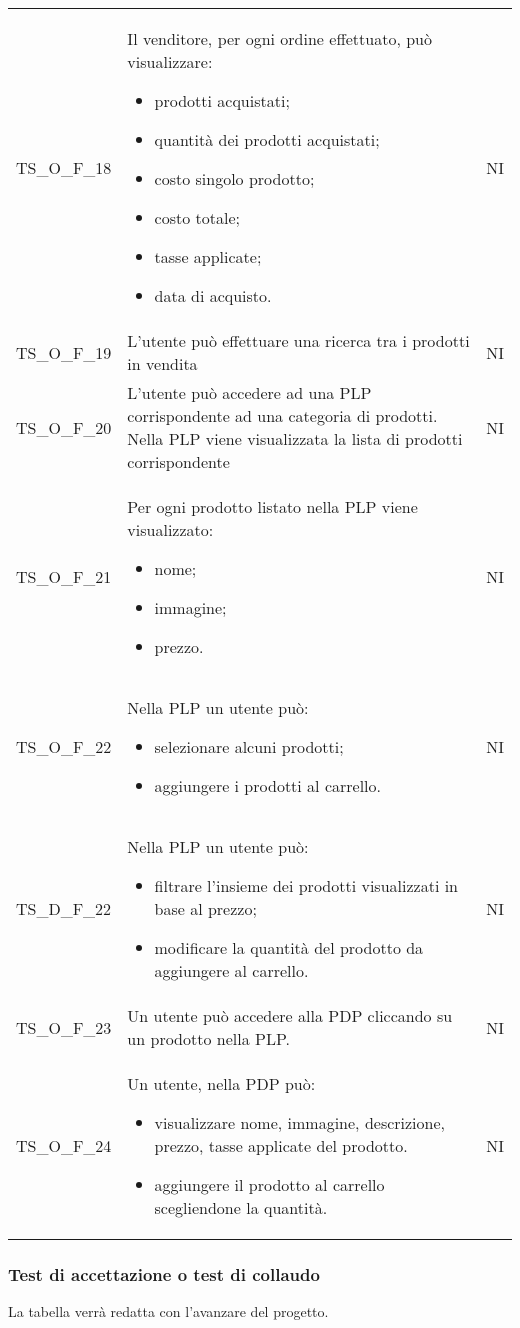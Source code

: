 {\begin{longtable}{C{3cm} C{10.2cm} C{1.5cm}}
TS\_O\_F\_18 & Il venditore, per ogni ordine effettuato, può visualizzare:
\begin{itemize}
	\item prodotti acquistati;
	\item quantità dei prodotti acquistati;
	\item costo singolo prodotto;
	\item costo totale;
	\item tasse applicate;
	\item data di acquisto.
\end{itemize}
& NI\\





TS\_O\_F\_19 & L'utente può effettuare una ricerca tra i prodotti in vendita & NI\\

TS\_O\_F\_20 & L'utente può accedere ad una PLP corrispondente ad una categoria di prodotti. Nella PLP viene visualizzata la lista di prodotti corrispondente & NI\\

TS\_O\_F\_21 & Per ogni prodotto listato nella PLP viene visualizzato:
\begin{itemize}
	\item nome;
	\item immagine;
	\item prezzo.
\end{itemize} & NI\\

TS\_O\_F\_22 & Nella PLP un utente può:
\begin{itemize}
	\item selezionare alcuni prodotti;
	\item aggiungere i prodotti al carrello.
\end{itemize} & NI\\

TS\_D\_F\_22 & Nella PLP un utente può:
\begin{itemize}
	\item filtrare l'insieme dei prodotti visualizzati in base al prezzo;
	\item modificare la quantità del prodotto da aggiungere al carrello.
\end{itemize} & NI\\

TS\_O\_F\_23 & Un utente può accedere alla PDP cliccando su un prodotto nella PLP. & NI\\

TS\_O\_F\_24 & Un utente, nella PDP può:
\begin{itemize}
	\item visualizzare nome, immagine, descrizione, prezzo, tasse applicate del prodotto.
	\item aggiungere il prodotto al carrello scegliendone la quantità.
\end{itemize} & NI\\



\end{longtable}


}
\subsubsection{Test di accettazione o test di collaudo}
La tabella verrà redatta con l'avanzare del progetto.